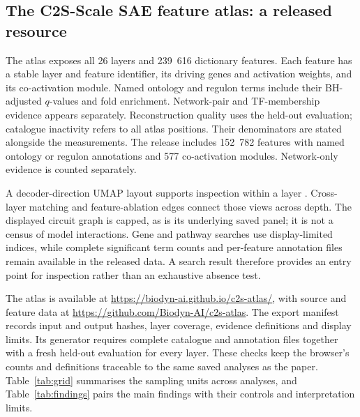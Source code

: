 \documentclass[review,authoryear,12pt]{elsarticle}
\begin{document}
\subsection{The C2S-Scale SAE feature atlas: a released resource}
\label{sec:atlas}

The atlas exposes all 26 layers and 239~616 dictionary features. Each feature has a stable layer
and feature identifier, its driving genes and activation weights, and its co-activation module.
Named ontology and regulon terms include their BH-adjusted $q$-values and fold enrichment.
Network-pair and TF-membership evidence appears separately. Reconstruction quality uses the
held-out evaluation; catalogue inactivity refers to all atlas positions. Their denominators are
stated alongside the measurements.
The release includes 152~782 features with named ontology or regulon annotations and 577
co-activation modules. Network-only evidence is counted separately.

A decoder-direction UMAP layout supports inspection within a layer \citep{ref50}.
Cross-layer matching and feature-ablation edges connect those views across depth. The displayed
circuit graph is capped, as is its underlying saved panel; it is not a census of model interactions.
Gene and pathway searches use display-limited indices, while complete significant term counts and
per-feature annotation files remain available in the released data. A search result therefore
provides an entry point for inspection rather than an exhaustive absence test.

The atlas is available at \url{https://biodyn-ai.github.io/c2s-atlas/}, with source and feature data at
\url{https://github.com/Biodyn-AI/c2s-atlas}. The export manifest records input and output hashes,
layer coverage, evidence definitions and display limits. Its generator requires complete catalogue
and annotation files together with a fresh held-out evaluation for every layer. These checks keep
the browser's counts and definitions traceable to the same saved analyses as the paper.
Table~\ref{tab:grid} summarises the sampling units across analyses, and
Table~\ref{tab:findings} pairs the main findings with their controls and interpretation limits.
\end{document}
